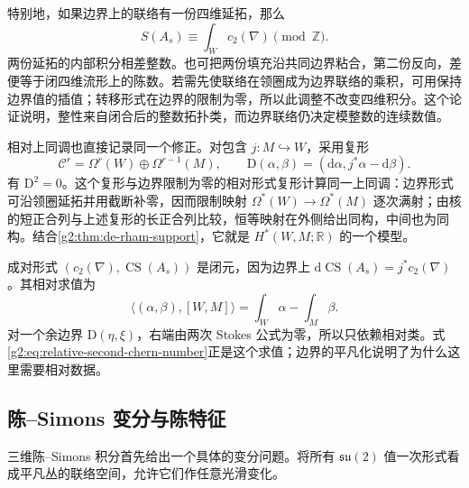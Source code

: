 特别地，如果边界上的联络有一份四维延拓，那么
\begin{equation}\label{g2:eq:chern-simons-extension-mod-integer}
	S(A_s)\equiv\int_Wc_2(\nabla)\pmod{\mathbb Z}.
\end{equation}
两份延拓的内部积分相差整数。也可把两份填充沿共同边界粘合，第二份反向，差便等于闭四维流形上的陈数。若需先使联络在领圈成为边界联络的乘积，可用保持边界值的插值；转移形式在边界的限制为零，所以此调整不改变四维积分。这个论证说明，整性来自闭合后的整数拓扑类，而边界联络仍决定模整数的连续数值。

\ProseParagraphBreak

相对上同调也直接记录同一个修正。对包含 \(j:M\hookrightarrow W\)，采用复形
\[
	\mathcal C^r=\Omega^r(W)\oplus\Omega^{r-1}(M),\qquad
	\mathrm D(\alpha,\beta)=(\mathrm d\alpha,j^*\alpha-\mathrm d\beta).
\]
有 \(\mathrm D^2=0\)。这个复形与边界限制为零的相对形式复形计算同一上同调：边界形式可沿领圈延拓并用截断补零，因而限制映射 \(\Omega^*(W)\to\Omega^*(M)\) 逐次满射；由核的短正合列与上述复形的长正合列比较，恒等映射在外侧给出同构，中间也为同构。结合\cref{g2:thm:de-rham-support}，它就是 \(H^*(W,M;\mathbb R)\) 的一个模型。

\ProseParagraphBreak

成对形式 \((c_2(\nabla),\operatorname{CS}(A_s))\) 是闭元，因为边界上 \(\mathrm d\operatorname{CS}(A_s)=j^*c_2(\nabla)\)。其相对求值为
\[
	\langle(\alpha,\beta),[W,M]\rangle=\int_W\alpha-\int_M\beta.
\]
对一个余边界 \(\mathrm D(\eta,\xi)\)，右端由两次 Stokes 公式为零，所以只依赖相对类。式\eqref{g2:eq:relative-second-chern-number}正是这个求值；边界的平凡化说明了为什么这里需要相对数据。

\subsection{陈–Simons 变分与陈特征}
\label{g2:subsec:2204:04}
三维陈--Simons 积分首先给出一个具体的变分问题。将所有 \(\mathfrak{su}(2)\) 值一次形式看成平凡丛的联络空间，允许它们作任意光滑变化。

